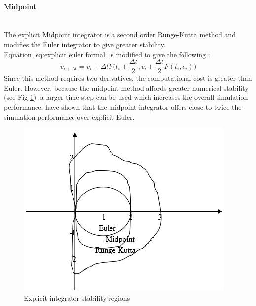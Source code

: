 \paragraph{Midpoint}\leavevmode\\
The explicit Midpoint integrator is a second order Runge-Kutta method and modifies the Euler integrator to give greater stability.
\\Equation \ref{eq:explicit euler formal} is modified to give the following \parencite[3]{Wang2009a}:
\begin{equation}
\label{eq:midpoint}
  v_{i + \Delta t} = v_{i} + \Delta t F\bigg(t_{i} + \frac{\Delta t}{2}, v_{i} + \frac{\Delta t}{2}F(t_{i}, v_{i})\bigg)
\end{equation}
Since this method requires two derivatives, the computational cost is greater than Euler. However, because the midpoint method affords greater numerical stability (see Fig \ref{fig:stability regions}), a larger time step can be used which increases the overall simulation performance; \textcite{Wang2009a} have shown that the midpoint integrator offers close to twice the simulation performance over explicit Euler.
\begin{figure}[tp]
   \begin{center}
     \includegraphics{Figures/stability_diagram.png}
   \end{center}
   \caption[Explicit integrator stability regions]{Explicit integrator stability regions \parencite[4]{Wang2009a}}
   \label{fig:stability regions}
\end{figure}

